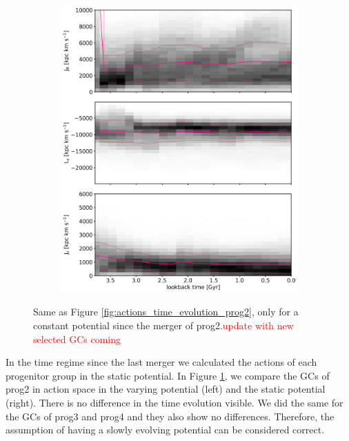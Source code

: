 \begin{figure}[htbp]
\begin{subfigure}[c]{0.48\textwidth}
	    \includegraphics[width=\textwidth]{plots/Dynamics/mean_pot/action_time_evolution_hist_mean_prog2.png}
    \end{subfigure}
    \caption{Same as Figure \ref{fig:actions_time_evolution_prog2}, only for a constant potential since the merger of prog2.\textcolor{red}{update with new selected GCs coming}}\label{fig:comparison_actions_time_evolution_mean_pot_prog2}
\end{figure}
In the time regime since the last merger we calculated the actions of each progenitor group in the static potential. In Figure \ref{fig:comparison_actions_time_evolution_mean_pot_prog2}, we compare the \acp{GC} of prog2 in action space in the varying potential (left) and the static potential (right). There is no difference in the time evolution visible. We did the same for the \acp{GC} of prog3 and prog4 and they also show no differences. Therefore, the assumption of having a slowly evolving potential can be considered correct.
\iffalse

